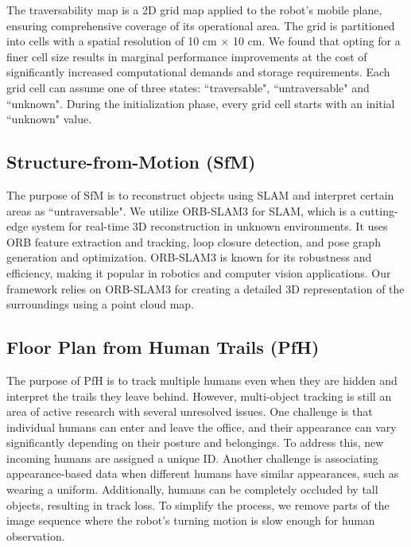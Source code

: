 \documentclass[letterpaper, 10 pt, conference]{ieeeconf}
\begin{document}
The traversability map is a 2D grid map applied to the robot's mobile plane, ensuring comprehensive coverage of its operational area. The grid is partitioned into cells with a spatial resolution of 10 cm $\times$ 10 cm. We found that opting for a finer cell size results in marginal performance improvements at the cost of significantly increased computational demands and storage requirements. Each grid cell can assume one of three states: ``traversable", ``untraversable" and ``unknown". During the initialization phase, every grid cell starts with an initial ``unknown" value.

\subsection{Structure-from-Motion (SfM)}\label{sec:B}

The purpose of SfM is to reconstruct objects using SLAM and interpret certain areas as ``untraversable". We utilize ORB-SLAM3\cite{r36} for SLAM, which is a cutting-edge system for real-time 3D reconstruction in unknown environments. It uses ORB feature extraction and tracking, loop closure detection, and pose graph generation and optimization. ORB-SLAM3 is known for its robustness and efficiency, making it popular in robotics and computer vision applications. Our framework relies on ORB-SLAM3 for creating a detailed 3D representation of the surroundings using a point cloud map.

\subsection{Floor Plan from Human Trails (PfH)} \label{sec:C}

The purpose of PfH is to track multiple humans even when they are hidden and interpret the trails they leave behind. However, multi-object tracking is still an area of active research with several unresolved issues. One challenge is that individual humans can enter and leave the office, and their appearance can vary significantly depending on their posture and belongings\cite{r37}. To address this, new incoming humans are assigned a unique ID\cite{r38}. Another challenge is associating appearance-based data when different humans have similar appearances, such as wearing a uniform\cite{r39}. Additionally, humans can be completely occluded by tall objects, resulting in track loss\cite{r40}. To simplify the process, we remove parts of the image sequence where the robot's turning motion is slow enough for human observation.
\end{document}
